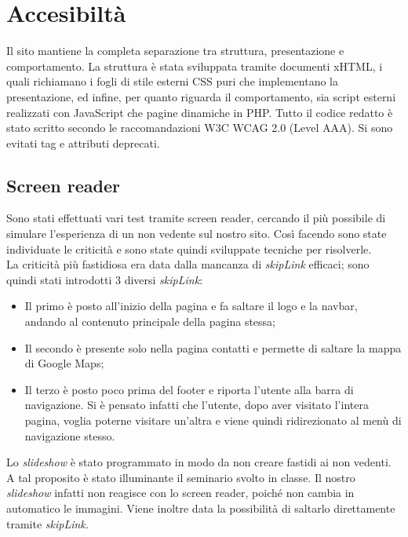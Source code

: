 \section{Accesibiltà}

Il sito mantiene la completa separazione tra struttura, presentazione e comportamento. La struttura è stata sviluppata tramite documenti xHTML, i quali richiamano i fogli di stile esterni CSS puri che implementano la presentazione, ed infine, per quanto riguarda il comportamento, sia script esterni realizzati con JavaScript che pagine dinamiche in PHP.
Tutto il codice redatto è stato scritto secondo le raccomandazioni W3C WCAG 2.0 (Level AAA).
Si sono evitati tag e attributi deprecati. \\

\subsection{Screen reader}
Sono stati effettuati vari test tramite screen reader, cercando il più possibile di simulare l’esperienza di un non vedente sul nostro sito. Così facendo sono state individuate le criticità e sono state quindi sviluppate tecniche per risolverle. \\


La criticità più fastidiosa era data dalla mancanza di \textit{skipLink} efficaci;
sono quindi stati introdotti 3 diversi \textit{skipLink}:
\begin{itemize}
\item Il primo è posto all’inizio della pagina e fa saltare il logo e la navbar, andando al contenuto principale della pagina stessa;
\item Il secondo è presente solo nella pagina contatti e permette di saltare la mappa di Google Maps;
\item Il terzo è posto poco prima del footer e riporta l’utente alla barra di navigazione. Si è pensato infatti che l’utente, dopo aver visitato l’intera pagina, voglia poterne visitare un’altra e viene quindi ridirezionato al menù di navigazione stesso. \\ 
\end{itemize}



Lo \textit{slideshow} è stato programmato in modo da non creare fastidi ai non vedenti. A tal proposito è stato illuminante il seminario svolto in classe.
Il nostro \textit{slideshow} infatti non reagisce con lo screen reader, poiché non cambia in automatico le immagini. Viene inoltre data la possibilità di saltarlo direttamente tramite \textit{skipLink.}\\

